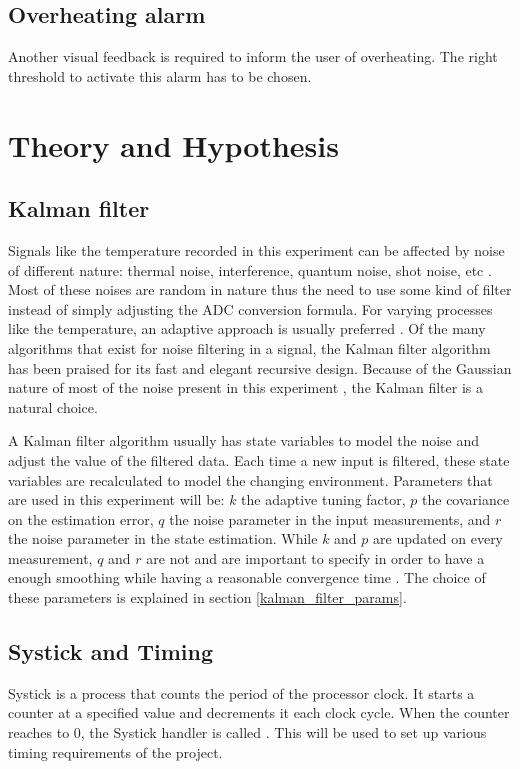 \documentclass[12pt]{article}
\begin{document}
\subsection{Overheating alarm}
Another visual feedback is required to inform the user of overheating. The right threshold to activate this alarm has to be chosen.

\section{Theory and Hypothesis}
\subsection{Kalman filter}
\label{kalman_filter}
Signals like the temperature recorded in this experiment can be affected by noise of different nature: thermal noise, interference, quantum noise, shot noise, etc \cite{kuo1995active}. Most of these noises are random in nature thus the need to use some kind of filter instead of simply adjusting the ADC conversion formula. For varying processes like the temperature, an adaptive approach is usually preferred \cite{kuo1995active}. Of the many algorithms that exist for noise filtering in a signal, the Kalman filter algorithm \cite{kalman1960new} has been praised for its fast and elegant recursive design. Because of the Gaussian nature of most of the noise present in this experiment \cite{kish2000noise}, the Kalman filter is a natural choice. 

A Kalman filter algorithm usually has state variables to model the noise and adjust the value of the filtered data. Each time a new input is filtered, these state variables are recalculated to model the changing environment. Parameters that are used in this experiment will be: $k$ the  adaptive  tuning  factor, $p$ the covariance on the estimation error, $q$ the noise parameter in the  input  measurements,  and $r$ the noise parameter in the  state  estimation. While $k$ and $p$ are updated on every measurement, $q$ and $r$ are not and are important to specify in order to have a enough smoothing while having a reasonable convergence time \cite{kalman1960new}. The choice of these parameters is explained in section \ref{kalman_filter_params}.

\subsection{Systick and Timing}
Systick is a process that counts the period of the processor clock. It starts a counter at a specified value and decrements it each clock cycle. When the counter reaches to 0, the Systick handler is called \cite{STMCubeDatasheet}. This will be used to set up various timing requirements of the project.
\end{document}
